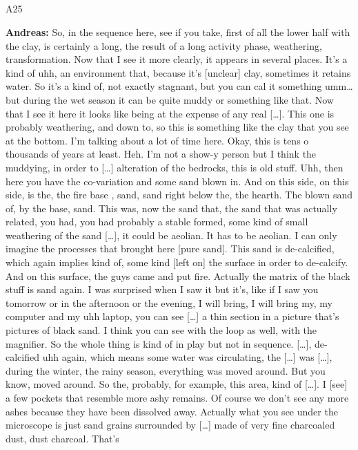 \documentclass[
  canadian,
]{article}
\makeatletter
\let\oldsubparagraph\subparagraph
\renewcommand{\subparagraph}{
    \@ifstar
      \xxxSubParagraphStar
      \xxxSubParagraphNoStar
  }
\newcommand{\xxxSubParagraphStar}[1]{\oldsubparagraph*{#1}\mbox{}}
\newcommand{\xxxSubParagraphNoStar}[1]{\oldsubparagraph{#1}\mbox{}}
\makeatother
\begin{document}
\subparagraph{A25}\label{sec-A25}

\textbf{Andreas:} So, in the sequence here, see if you take, first of
all the lower half with the clay, is certainly a long, the result of a
long activity phase, weathering, transformation. Now that I see it more
clearly, it appears in several places. It's a kind of uhh, an
environment that, because it's {[}unclear{]} clay, sometimes it retains
water. So it's a kind of, not exactly stagnant, but you can cal it
something umm\ldots{} but during the wet season it can be quite muddy or
something like that. Now that I see it here it looks like being at the
expense of any real {[}\ldots{]}. This one is probably weathering, and
down to, so this is something like the clay that you see at the bottom.
I'm talking about a lot of time here. Okay, this is tens o thousands of
years at least. Heh. I'm not a show-y person but I think the muddying,
in order to {[}\ldots{]} alteration of the bedrocks, this is old stuff.
Uhh, then here you have the co-variation and some sand blown in. And on
this side, on this side, is the, the fire base , sand, sand right below
the, the hearth. The blown sand of, by the base, sand. This was, now the
sand that, the sand that was actually related, you had, you had probably
a stable formed, some kind of small weathering of the sand {[}\ldots{]},
it could be aeolian. It has to be aeolian. I can only imagine the
processes that brought here {[}pure sand{]}. This sand is de-calcified,
which again implies kind of, some kind {[}left on{]} the surface in
order to de-calcify. And on this surface, the guys came and put fire.
Actually the matrix of the black stuff is sand again. I was surprised
when I saw it but it's, like if I saw you tomorrow or in the afternoon
or the evening, I will bring, I will bring my, my computer and my uhh
laptop, you can see {[}\ldots{]} a thin section in a picture that's
pictures of black sand. I think you can see with the loop as well, with
the magnifier. So the whole thing is kind of in play but not in
sequence. {[}\ldots{]}, de-calcified uhh again, which means some water
was circulating, the {[}\ldots{]} was {[}\ldots{]}, during the winter,
the rainy season, everything was moved around. But you know, moved
around. So the, probably, for example, this area, kind of {[}\ldots{]}.
I {[}see{]} a few pockets that resemble more ashy remains. Of course we
don't see any more ashes because they have been dissolved away. Actually
what you see under the microscope is just sand grains surrounded by
{[}\ldots{]} made of very fine charcoaled dust, dust charcoal. That's
\end{document}
